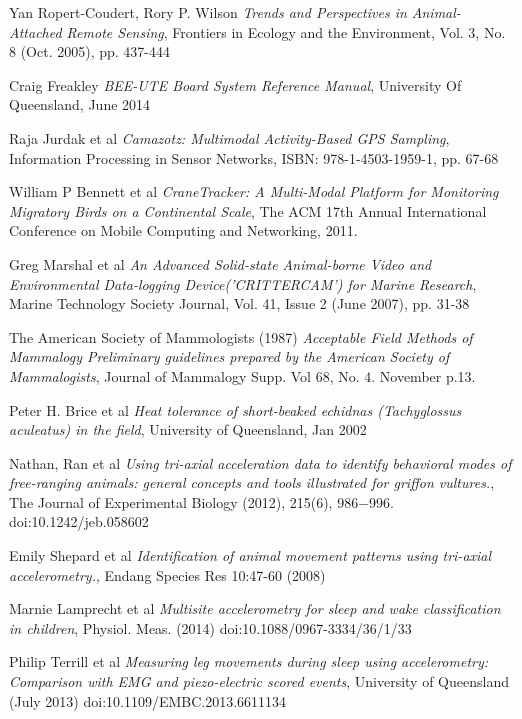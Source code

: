 \documentclass[12pt,openany,a4paper]{book}
\begin{document}
\begin{thebibliography}{99}
	Yan Ropert-Coudert, Rory P. Wilson
	\emph{Trends and Perspectives in Animal-Attached Remote Sensing},
	Frontiers in Ecology and the Environment,
	Vol. 3, No. 8 (Oct. 2005), pp. 437-444
	
	Craig Freakley
	\emph{BEE-UTE Board System Reference Manual},
	University Of Queensland, June 2014
	
	Raja Jurdak et al
	\emph{Camazotz: Multimodal Activity-Based GPS Sampling},
	Information Processing in Sensor Networks,
	ISBN: 978-1-4503-1959-1, pp. 67-68
	
	William P Bennett et al
	\emph{CraneTracker: A Multi-Modal Platform for Monitoring Migratory Birds on a Continental Scale},
	The ACM 17th Annual International Conference on Mobile Computing and Networking, 2011.
	
	Greg Marshal et al
	\emph{An Advanced Solid-state Animal-borne Video and Environmental Data-logging Device('CRITTERCAM') for Marine Research},
	Marine Technology Society Journal,
	Vol. 41, Issue 2 (June 2007), pp. 31-38
	
	The American Society of Mammologists (1987) \emph{Acceptable Field Methods of Mammalogy Preliminary guidelines prepared by the American Society of Mammalogists},
	Journal of Mammalogy Supp. Vol 68, No. 4. November p.13.
	
	Peter H. Brice et al
	\emph{Heat tolerance of short-beaked echidnas (Tachyglossus aculeatus) in the field},
	University of Queensland, Jan 2002
	
	Nathan, Ran et al
	\emph{Using tri-axial acceleration data to identify behavioral modes of free-ranging animals: general concepts and tools illustrated for griffon vultures.},
	The Journal of Experimental Biology (2012), 215(6), 986$-$996. doi:10.1242/jeb.058602
	
	Emily Shepard et al
	\emph{Identification of animal movement patterns using tri-axial accelerometry.},
	Endang Species Res 10:47-60 (2008)
	
	Marnie Lamprecht et al
	\emph{Multisite accelerometry for sleep and wake classification in children},
	Physiol. Meas. (2014) doi:10.1088/0967-3334/36/1/33
	
	Philip Terrill et al
	\emph{Measuring leg movements during sleep using accelerometry: Comparison with EMG and piezo-electric scored events},
	University of Queensland (July 2013) doi:10.1109/EMBC.2013.6611134
	

\end{thebibliography}
\end{document}
